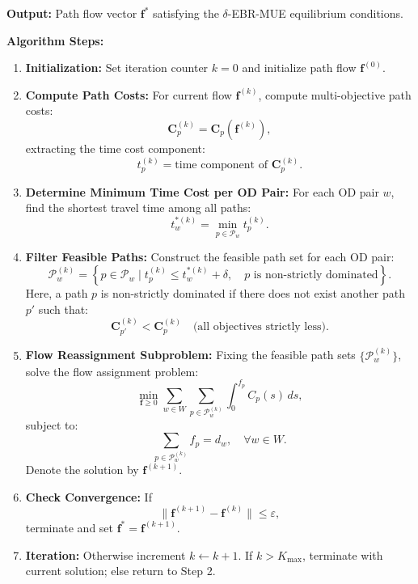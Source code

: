 \documentclass[11pt]{article}
\begin{document}
\vspace{0.5em}
\textbf{Output:} Path flow vector \(\mathbf{f}^*\) satisfying the $\delta$-EBR-MUE equilibrium conditions.

\vspace{1em}
\textbf{Algorithm Steps:}
\begin{enumerate}[label=\arabic*.]
    \item \textbf{Initialization:} Set iteration counter \(k = 0\) and initialize path flow \(\mathbf{f}^{(0)}\).
    
    \item \textbf{Compute Path Costs:} For current flow \(\mathbf{f}^{(k)}\), compute multi-objective path costs:
    \[
        \mathbf{C}_p^{(k)} = \mathbf{C}_p(\mathbf{f}^{(k)}),
    \]
    extracting the time cost component:
    \[
        t_p^{(k)} = \text{time component of } \mathbf{C}_p^{(k)}.
    \]
    
    \item \textbf{Determine Minimum Time Cost per OD Pair:} For each OD pair \(w\), find the shortest travel time among all paths:
    \[
        t_w^{*(k)} = \min_{p \in \mathcal{P}_w} t_p^{(k)}.
    \]
    
    \item \textbf{Filter Feasible Paths:} Construct the feasible path set for each OD pair:
    \[
        \mathcal{P}_w^{(k)} = \left\{ p \in \mathcal{P}_w \mid t_p^{(k)} \leq t_w^{*(k)} + \delta, \quad p \text{ is non-strictly dominated} \right\}.
    \]
    Here, a path \(p\) is non-strictly dominated if there does not exist another path \(p'\) such that:
    \[
        \mathbf{C}_{p'}^{(k)} < \mathbf{C}_p^{(k)} \quad \text{(all objectives strictly less)}.
    \]
    
    \item \textbf{Flow Reassignment Subproblem:} Fixing the feasible path sets \(\{\mathcal{P}_w^{(k)}\}\), solve the flow assignment problem:
    \[
        \min_{\mathbf{f} \geq 0} \sum_{w \in W} \sum_{p \in \mathcal{P}_w^{(k)}} \int_0^{f_p} C_p(s) \, ds,
    \]
    subject to:
    \[
        \sum_{p \in \mathcal{P}_w^{(k)}} f_p = d_w, \quad \forall w \in W.
    \]
    Denote the solution by \(\mathbf{f}^{(k+1)}\).
    
    \item \textbf{Check Convergence:} If
    \[
        \| \mathbf{f}^{(k+1)} - \mathbf{f}^{(k)} \| \leq \varepsilon,
    \]
    terminate and set \(\mathbf{f}^* = \mathbf{f}^{(k+1)}\).
    
    \item \textbf{Iteration:} Otherwise increment \(k \leftarrow k + 1\). If \(k > K_{\max}\), terminate with current solution; else return to Step 2.
\end{enumerate}
\end{document}
